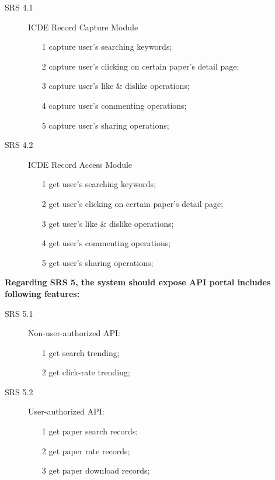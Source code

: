 \begin{description}
    \item[SRS 4.1] ICDE Record Capture Module
    \begin{itemize}
        \item [1]
              capture user's searching keywords;
        \item [2]
              capture user's clicking on certain paper's detail page;
        \item [3]
              capture user's like \& dislike operations;
        \item [4]
              capture user's commenting operations;
        \item [5]
              capture user's sharing operations;
    \end{itemize}
    
    \item[SRS 4.2]ICDE Record Access Module
    \begin{itemize}
        \item [1]
              get user's searching keywords;
        \item [2]
              get user's clicking on certain paper's detail page;
        \item [3]
              get user's like \& dislike operations;
        \item [4]
              get user's commenting operations;
        \item [5]
              get user's sharing operations;
    \end{itemize}
\end{description}

\noindent
\textbf{Regarding SRS 5, the system should expose API portal includes following features:}

\begin{description}
    \item[SRS 5.1] Non-user-authorized API:
    \begin{itemize}
        \item [1]
              get search trending;
        \item [2]
              get click-rate trending;
    \end{itemize}
    
    \item[SRS 5.2] User-authorized API:
    \begin{itemize}
        \item [1]
              get paper search records;
        \item [2]
              get paper rate records;
        \item [3]
              get paper download records;
    \end{itemize}
\end{description}

